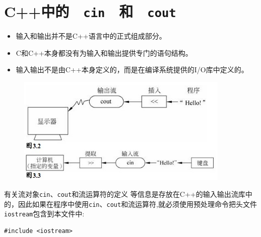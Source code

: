 \section{C++中的　\lstinline|cin|　和　\lstinline|cout|}

\begin{frame}{\secname}
  \begin{itemize}
  \item  输入和输出并不是C++语言中的正式组成部分。
  \item C和C++本身都没有为输入和输出提供专门的语句结构。
  \item 输入输出不是由C++本身定义的，而是在编译系统提供的I/O库中定义的。
  \end{itemize}

\end{frame}

\begin{frame}{\secname}
  \begin{figure}[htbp]
    \centering
    \includegraphics[width=4in]{slide04/images/cin_cout.jpg}
  \end{figure}
\end{frame}

\begin{frame}[fragile]{\secname}
  有关流对象\lstinline|cin|、\lstinline|cout|和流运算符的定义
  等信息是存放在C++的输入输出流库中的，因此如果在程序中使用\lstinline|cin|、\lstinline|cout|和流运算符,就必须使用预处理命令把头文件\lstinline|iostream|包含到本文件中:
  \begin{lstlisting}
#include <iostream>    
  \end{lstlisting}
\end{frame}

